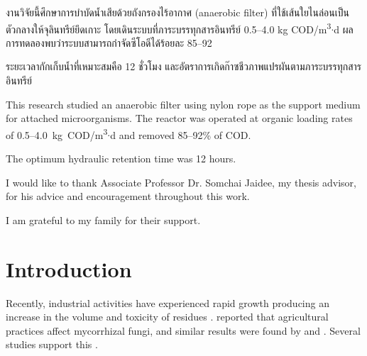 \documentclass[english]{kuthesis}
\begin{document}
\frontmatter
\makecover
\makeapproval
\maketitlepage

\begin{thaiabstract}
  งานวิจัยนี้ศึกษาการบำบัดน้ำเสียด้วยถังกรองไร้อากาศ (anaerobic filter) ที่ใช้เส้นใยไนล่อนเป็นตัวกลางให้จุลินทรีย์ยึดเกาะ
  โดยเดินระบบที่ภาระบรรทุกสารอินทรีย์ 0.5--4.0 kg COD/m\textsuperscript{3}$\cdot$d
  ผลการทดลองพบว่าระบบสามารถกำจัดซีโอดีได้ร้อยละ 85--92

  ระยะเวลากักเก็บน้ำที่เหมาะสมคือ 12 ชั่วโมง และอัตราการเกิดก๊าซชีวภาพแปรผันตามภาระบรรทุกสารอินทรีย์
\end{thaiabstract}

\begin{englishabstract}
  This research studied an anaerobic filter using nylon rope as the support medium for
  attached microorganisms. The reactor was operated at organic loading rates of
  0.5--4.0~kg~COD/m\textsuperscript{3}$\cdot$d and removed 85--92\% of COD.

  The optimum hydraulic retention time was 12 hours.
\end{englishabstract}

\begin{acknowledgments}
  I would like to thank Associate Professor Dr. Somchai Jaidee, my thesis advisor, for his
  advice and encouragement throughout this work.

  I am grateful to my family for their support.
\end{acknowledgments}

\tableofcontents
\listoftables
\listoffigures

\begin{abbreviations}
\end{abbreviations}

\mainmatter

\chapter{Introduction}

Recently, industrial activities have experienced rapid growth producing an increase in the
volume and toxicity of residues \parencite{peterson2004}. \textcite{boddington2000a} reported
that agricultural practices affect mycorrhizal fungi, and similar results were found by
\textcite{chutima2551} and \textcite[3]{bago2000}. Several studies support this
\parencite{buddhakulsomsiri2008,seranevijaikitkhan2008,who2006}.
\end{document}

